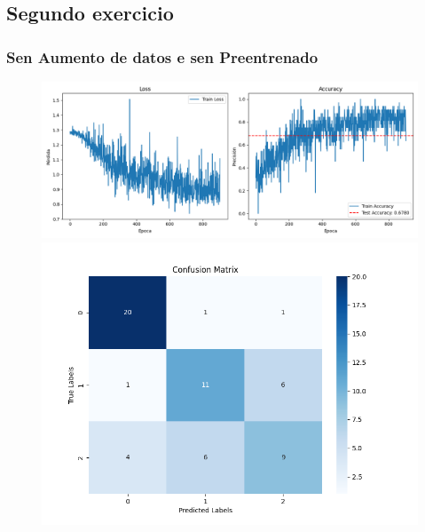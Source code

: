 \documentclass{article}
\begin{document}
\begin{figure}[H]
\begin{minipage}{0.7\textwidth}
    \end{minipage}
\end{figure}
\subsection{Segundo exercicio}
\subsubsection{Sen Aumento de datos e sen Preentrenado}
\begin{figure}[H]
    \centering
    \begin{minipage}{0.55\textwidth}
        \centering
        \includegraphics[width=\linewidth]{../figures/LOSS__A_False_P_False_D_True_MLP_True_efficientnet_b4.png}
    \end{minipage}
    \begin{minipage}{0.3\textwidth}
        \centering
        \includegraphics[width=\linewidth]{../figures/CM__A_False_P_False_D_True_MLP_True_efficientnet_b4.png}
    \end{minipage}

\end{figure}
\end{document}
